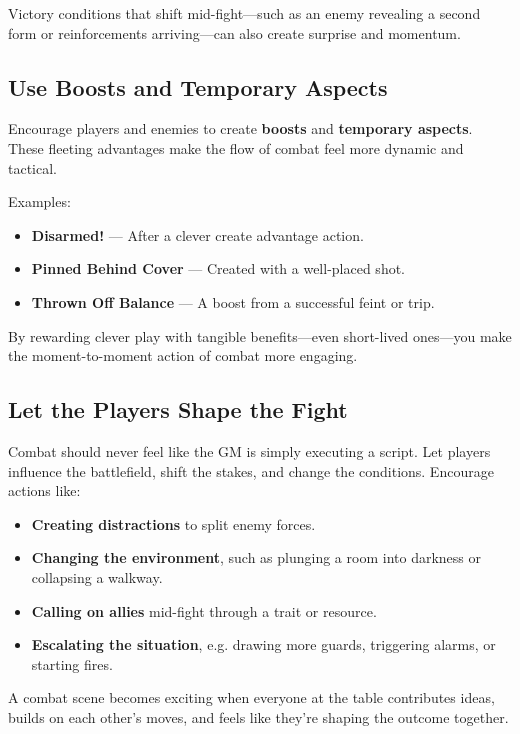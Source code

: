 \begin{multicols}{2}
Victory conditions that shift mid-fight—such as an enemy revealing a second form or reinforcements arriving—can also create surprise and momentum.

\subsection*{Use Boosts and Temporary Aspects}

Encourage players and enemies to create \textbf{boosts} and \textbf{temporary aspects}. These fleeting advantages make the flow of combat feel more dynamic and tactical.

Examples:
\begin{itemize}
  \item \textbf{Disarmed!} — After a clever create advantage action.
  \item \textbf{Pinned Behind Cover} — Created with a well-placed shot.
  \item \textbf{Thrown Off Balance} — A boost from a successful feint or trip.
\end{itemize}

By rewarding clever play with tangible benefits—even short-lived ones—you make the moment-to-moment action of combat more engaging.

\subsection*{Let the Players Shape the Fight}

Combat should never feel like the GM is simply executing a script. Let players influence the battlefield, shift the stakes, and change the conditions. Encourage actions like:

\begin{itemize}
  \item \textbf{Creating distractions} to split enemy forces.
  \item \textbf{Changing the environment}, such as plunging a room into darkness or collapsing a walkway.
  \item \textbf{Calling on allies} mid-fight through a trait or resource.
  \item \textbf{Escalating the situation}, e.g. drawing more guards, triggering alarms, or starting fires.
\end{itemize}

A combat scene becomes exciting when everyone at the table contributes ideas, builds on each other’s moves, and feels like they’re shaping the outcome together.


\end{multicols}
